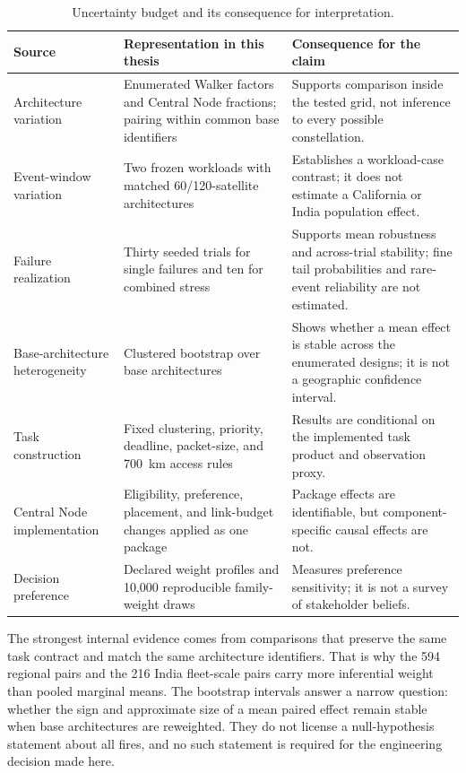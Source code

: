 \begin{table}[htbp]
\centering
\scriptsize
\caption{Uncertainty budget and its consequence for interpretation.}
\label{tab:uncertainty_budget}
\begin{tabularx}{\textwidth}{L{0.20\textwidth}L{0.22\textwidth}Y}
\toprule
Source & Representation in this thesis & Consequence for the claim \\
\midrule
Architecture variation & Enumerated Walker factors and Central Node fractions; pairing within common base identifiers & Supports comparison inside the tested grid, not inference to every possible constellation. \\
Event-window variation & Two frozen workloads with matched 60/120-satellite architectures & Establishes a workload-case contrast; it does not estimate a California or India population effect. \\
Failure realization & Thirty seeded trials for single failures and ten for combined stress & Supports mean robustness and across-trial stability; fine tail probabilities and rare-event reliability are not estimated. \\
Base-architecture heterogeneity & Clustered bootstrap over base architectures \citep{Efron1979} & Shows whether a mean effect is stable across the enumerated designs; it is not a geographic confidence interval. \\
Task construction & Fixed clustering, priority, deadline, packet-size, and \SI{700}{\kilo\metre} access rules & Results are conditional on the implemented task product and observation proxy. \\
Central Node implementation & Eligibility, preference, placement, and link-budget changes applied as one package & Package effects are identifiable, but component-specific causal effects are not. \\
Decision preference & Declared weight profiles and 10,000 reproducible family-weight draws & Measures preference sensitivity; it is not a survey of stakeholder beliefs. \\
\bottomrule
\end{tabularx}
\end{table}

The strongest internal evidence comes from comparisons that preserve the same task contract and match the same architecture identifiers. That is why the 594 regional pairs and the 216 India fleet-scale pairs carry more inferential weight than pooled marginal means. The bootstrap intervals answer a narrow question: whether the sign and approximate size of a mean paired effect remain stable when base architectures are reweighted. They do not license a null-hypothesis statement about all fires, and no such statement is required for the engineering decision made here.

